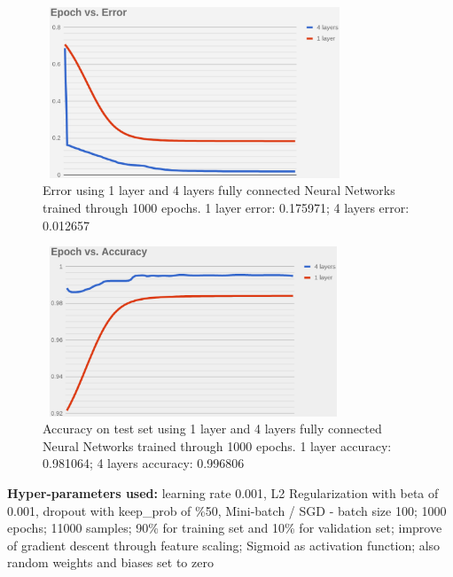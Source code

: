 \documentclass{llncs}       %
\begin{document}
\paragraph{}

\begin{figure}[h]
\centering
\includegraphics[width=9.08cm,height=5.11cm]{media/image10.eps}
\caption{ Error using 1 layer and 4 layers fully connected Neural Networks trained through 1000 epochs. 1 layer error:  0.175971;  4 layers error:  0.012657}
\end{figure}


\begin{figure}[h]
\centering
\includegraphics[width=9.00cm,height=5.07cm]{media/image11.eps}
\caption{Accuracy on test set using 1 layer and 4 layers fully 
connected Neural Networks trained through 1000 epochs. 1 layer accuracy: 
0.981064; 4 layers accuracy: 0.996806}
\end{figure}


\textbf{Hyper-parameters used: }learning rate 0.001, L2 Regularization with beta of 0.001, dropout with keep\_prob of \%50, Mini-batch / SGD 
- batch size 100; 1000 epochs; 11000 samples; 90\% for training set and 
10\% for validation set; improve of gradient descent through feature 
scaling; Sigmoid as activation function; also random weights and biases 
set to zero

 

\paragraph{}\paragraph{}
\end{document}
